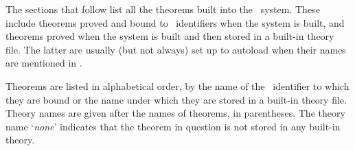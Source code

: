 The sections that follow list all the theorems built into the \HOL\ system.
These include theorems proved and bound to \ML\ identifiers when the system is
built, and theorems proved when the system is built and then stored in a
built-in theory file.  The latter are usually (but not always) set up to
autoload when their names are mentioned in \ML.  

Theorems are listed in alphabetical order, by the name of the \ML\ identifier
to which they are bound or the name under which they are stored in a built-in
theory file.  Theory names are given after the names of theorems, in
parentheses. The theory name `{\it none}' indicates that the theorem in
question is not stored in any built-in theory.
